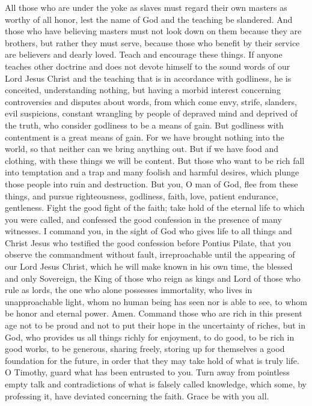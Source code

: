 \begin{biblechapter} %
 All those who are under the yoke as slaves must regard their own masters as worthy of all honor, lest the name of God and the teaching be slandered.
\verse And those who have believing masters must not look down on them because they are brothers, but rather they must serve, because those who benefit by their service are believers and dearly loved.
 Teach and encourage these things.
\verse If anyone teaches other doctrine and does not devote himself to the sound words of our Lord Jesus Christ and the teaching that is in accordance with godliness,
\verse he is conceited, understanding nothing, but having a morbid interest concerning controversies and disputes about words, from which come envy, strife, slanders, evil suspicions,
\verse constant wrangling by people of depraved mind and deprived of the truth, who consider godliness to be a means of gain.
\verse But godliness with contentment is a great means of gain.
\verse For we have brought nothing into the world, so that neither can we bring anything out.
\verse But if we have food and clothing, with these things we will be content.
\verse But those who want to be rich fall into temptation and a trap and many foolish and harmful desires, which plunge those people into ruin and destruction.
 But you, O man of God, flee from these things, and pursue righteousness, godliness, faith, love, patient endurance, gentleness.
\verse Fight the good fight of the faith; take hold of the eternal life to which you were called, and confessed the good confession in the presence of many witnesses.
\verse I command you, in the sight of God who gives life to all things and Christ Jesus who testified the good confession before Pontius Pilate,
\verse that you observe the commandment without fault, irreproachable until the appearing of our Lord Jesus Christ,
\verse which he will make known in his own time, the blessed and only Sovereign, the King of those who reign as kings and Lord of those who rule as lords,
\verse the one who alone possesses immortality, who lives in unapproachable light, whom no human being has seen nor is able to see, to whom be honor and eternal power. Amen.
 Command those who are rich in this present age not to be proud and not to put their hope in the uncertainty of riches, but in God, who provides us all things richly for enjoyment,
\verse to do good, to be rich in good works, to be generous, sharing freely,
\verse storing up for themselves a good foundation for the future, in order that they may take hold of what is truly life.
 O Timothy, guard what has been entrusted to you. Turn away from pointless empty talk and contradictions of what is falsely called knowledge,
\verse which some, by professing it, have deviated concerning the faith. Grace be with you all.
\end{biblechapter}

